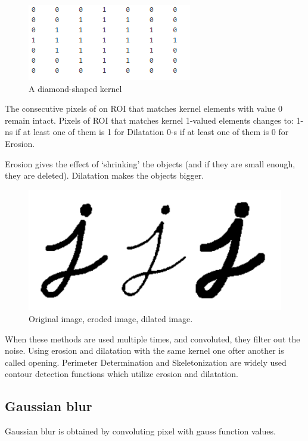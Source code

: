 \documentclass[12pt,twoside,a4paper]{article}
\begin{document}
 
\begin{figure}[H]
\centering
\includegraphics[width=0.4\paperwidth]{diam}
\caption{A diamond-shaped kernel\cite{morph}}
\end{figure}

The consecutive pixels of on ROI that matches kernel elements with value 0 remain intact.
Pixels of ROI that matches kernel 1-valued elements changes to:
1-ns if at least one of them is 1 for Dilatation
0-s if at least one of them is 0 for Erosion.

Erosion gives the effect of ‘shrinking’ the objects (and if they are small enough, they are deleted).
Dilatation makes the objects bigger.

 
\begin{figure}[H]
\centering
\includegraphics[width=0.4\paperwidth]{lett}
\caption{Original image, eroded image, dilated image.\cite{erdil}}
\end{figure}


When these methods are used multiple times, and convoluted, they filter out the noise.
Using erosion and dilatation with the same kernel one ofter another is called opening.
Perimeter Determination and Skeletonization are widely used contour detection functions which utilize erosion and dilatation\cite{erdil}.


\subsection{Gaussian blur}

Gaussian blur is obtained by convoluting pixel with gauss function values. 
\end{document}
